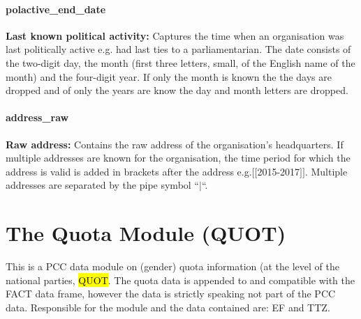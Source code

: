 \documentclass{article}
\begin{document}
\paragraph{polactive\_end\_date}
 \textbf{Last known political activity:} Captures the time when an organisation was last politically active e.g. had last ties to a parliamentarian. The date consists of the two-digit day, the month (first three letters, small, of the English name of the month) and the four-digit year. If only the month is known the the days are dropped and of only the years are know the day and month letters are dropped.

\paragraph{address\_raw}
 \textbf{Raw address:} Contains the raw address of the organisation's headquarters. If multiple addresses are known for the organisation, the time period for which the address is valid is added in brackets after the address e.g.$[$$[$2015-2017$]$$]$. Multiple addresses are separated by the pipe symbol ``$|$``.
 
 

 \section{The Quota Module (\gls{QUOT})}\label{QUOT}
This is a PCC data module on (gender) quota information (at the level of the national parties, \hl{QUOT}. The quota data is appended to and compatible with the \gls{FACT} data frame, however the data is strictly speaking not part of the PCC data. Responsible for the module and the data contained are: EF and TTZ. 

\end{document}

